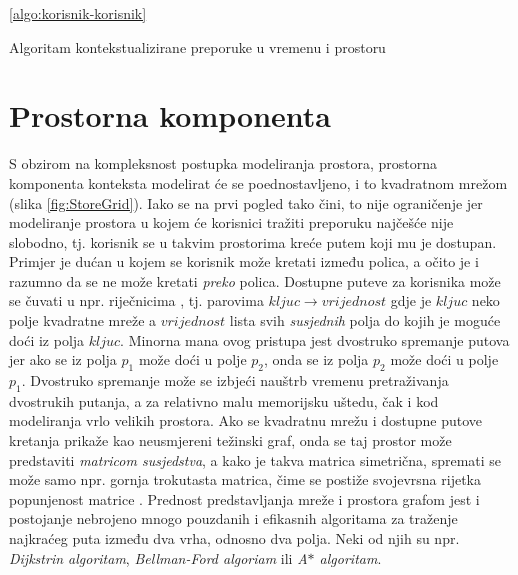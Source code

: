 \documentclass[times, utf8, diplomski, numeric]{fer}
\begin{document}
\ref{algo:korisnik-korisnik}
\begin{algorithm}
	\caption{Algoritam kontekstualizirane preporuke u vremenu i prostoru}
	\label{algo:TheAlgo}
	\begin{algorithmic}
		
		\ENDFOR
		
		
		\ENDFOR
		
		
	\end{algorithmic}
\end{algorithm}

\section{Prostorna komponenta}

S obzirom na kompleksnost postupka modeliranja prostora, prostorna komponenta
konteksta modelirat će se poednostavljeno, i to kvadratnom mrežom
(slika \ref{fig:StoreGrid}). Iako se na prvi pogled tako čini, to nije
ograničenje jer modeliranje prostora u kojem će korisnici tražiti preporuku
najčešće nije slobodno, tj. korisnik se u takvim prostorima kreće putem koji mu
je dostupan. Primjer je dućan u kojem se korisnik može kretati između polica, a
očito je i razumno da se ne može kretati \emph{preko} polica.
Dostupne puteve za korisnika može se čuvati u npr. riječnicima
, tj. parovima $kljuc \rightarrow vrijednost$ gdje je $kljuc$
neko polje kvadratne mreže a $vrijednost$ lista svih \emph{susjednih} polja do
kojih je moguće doći iz polja $kljuc$. Minorna mana ovog pristupa jest
dvostruko spremanje putova jer ako se iz polja $p_1$ može doći u polje $p_2$,
onda se iz polja $p_2$ može doći u polje $p_1$. Dvostruko spremanje može se
izbjeći nauštrb vremenu pretraživanja dvostrukih putanja, a za relativno malu
memorijsku uštedu, čak i kod modeliranja vrlo velikih prostora.
Ako se kvadratnu mrežu i dostupne putove kretanja prikaže kao neusmjereni
težinski graf, onda se taj prostor može predstaviti \emph{matricom
susjedstva}, a kako je takva matrica simetrična, spremati se može samo npr.
gornja trokutasta matrica, čime se postiže svojevrsna rijetka popunjenost
matrice .
Prednost predstavljanja mreže i prostora grafom jest i postojanje nebrojeno
mnogo pouzdanih i efikasnih algoritama za traženje najkraćeg puta između dva
vrha, odnosno dva polja. Neki od njih su npr. \emph{Dijkstrin algoritam},
\emph{Bellman-Ford algoriam} ili \emph{A$\ast$ algoritam}.
\end{document}
